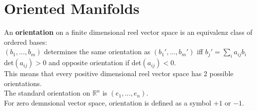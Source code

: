 \section{Oriented Manifolds}
\begin{definition}\label{9.1}
    An \textbf{orientation} on a finite dimensional reel vector space is an equivalenz class of ordered bases:\\
    $(b_1,...,b_m)$ determines the same orientation as $(b_1',...,b_m')$ iff $b_j'=\sum\limits_i a_{ij}b_i$ det$(a_{ij})>0$ and opposite orientation if det$(a_{ij})<0$.\\
    This means that every positive dimensional reel vector space has $2$ possible orientations.\\
    The standard orientation on $\mathbb{R}^n$ is $(e_1,...,e_n)$.\\
    For zero demnsional vector space, orientation is defined as a symbol $+1$ or $-1$.
\end{definition}

